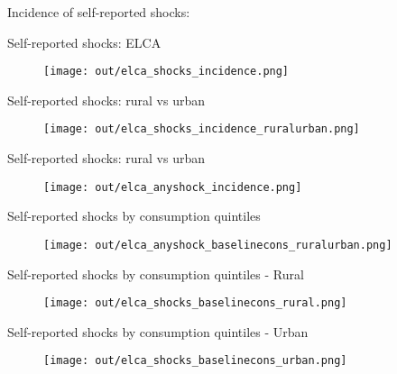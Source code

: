 \documentclass[aspectratio = 169]{beamer}
\begin{document}
\begin{frame}[c]{}         
	\centering
	\large Incidence of self-reported shocks: 
\end{frame}

\begin{frame}{Self-reported shocks: ELCA}

	\begin{figure}
		\texttt{[image: out/elca\_shocks\_incidence.png]}
   \end{figure}   

\end{frame}

\begin{frame}{Self-reported shocks: rural vs urban}

	\begin{figure}
		\texttt{[image: out/elca\_shocks\_incidence\_ruralurban.png]}
   \end{figure}   

\end{frame}

\begin{frame}{Self-reported shocks: rural vs urban}

	\begin{figure}
		\texttt{[image: out/elca\_anyshock\_incidence.png]}
   \end{figure}   

\end{frame}

\begin{frame}{Self-reported shocks by consumption quintiles}

	\begin{figure}
		\texttt{[image: out/elca\_anyshock\_baselinecons\_ruralurban.png]}
   \end{figure}   

\end{frame}

\begin{frame}{Self-reported shocks by consumption quintiles - Rural}

	\begin{figure}
		\texttt{[image: out/elca\_shocks\_baselinecons\_rural.png]}
   \end{figure}   

\end{frame}

\begin{frame}{Self-reported shocks by consumption quintiles - Urban}

	\begin{figure}
		\texttt{[image: out/elca\_shocks\_baselinecons\_urban.png]}
   \end{figure}   

\end{frame}
\end{document}
